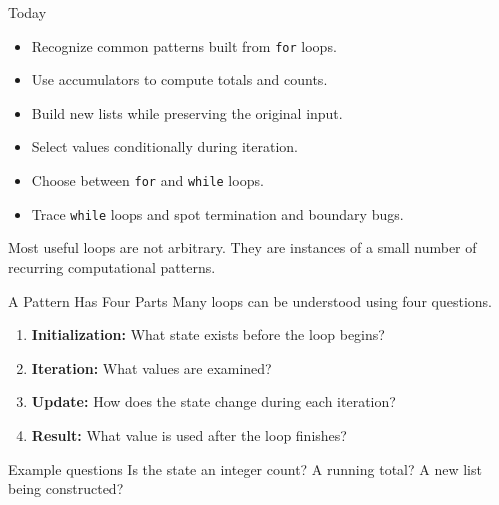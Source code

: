 \documentclass[aspectratio=169,10pt]{beamer}
\begin{document}
\makedecktitle

\begin{frame}{Today}
  \begin{itemize}
    \item Recognize common patterns built from \texttt{for} loops.
    \item Use accumulators to compute totals and counts.
    \item Build new lists while preserving the original input.
    \item Select values conditionally during iteration.
    \item Choose between \texttt{for} and \texttt{while} loops.
    \item Trace \texttt{while} loops and spot termination and boundary bugs.
  \end{itemize}

  \begin{keyidea}
    Most useful loops are not arbitrary. They are instances of a small number of recurring computational patterns.
  \end{keyidea}
\end{frame}




\begin{frame}{A Pattern Has Four Parts}
  Many loops can be understood using four questions.

  \begin{enumerate}
    \item \textbf{Initialization:} What state exists before the loop begins?
    \item \textbf{Iteration:} What values are examined?
    \item \textbf{Update:} How does the state change during each iteration?
    \item \textbf{Result:} What value is used after the loop finishes?
  \end{enumerate}

  \begin{block}{Example questions}
    Is the state an integer count? A running total? A new list being constructed?
  \end{block}
\end{frame}
\end{document}
